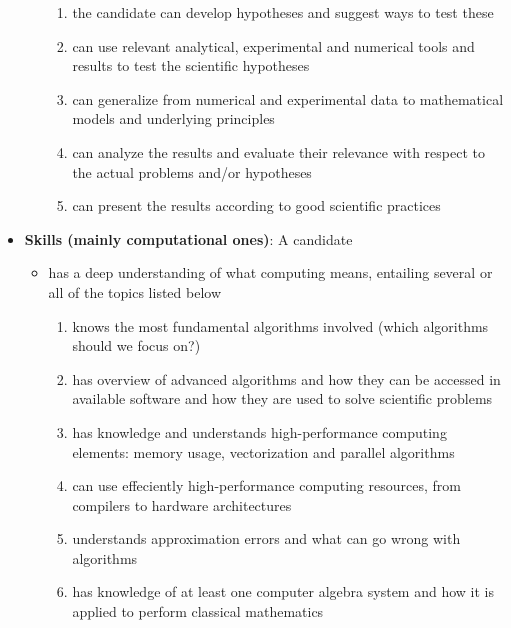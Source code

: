 \documentclass[%
oneside,                 %
final,                   %
10pt]{article}
\begin{document}
\begin{itemize}
\begin{itemize}
\begin{enumerate}
 \item the candidate can develop hypotheses and suggest ways to test these

 \item can use relevant analytical, experimental and numerical tools and results to test the scientific hypotheses

 \item can generalize from numerical and experimental data to mathematical models and underlying principles

 \item can analyze the results and evaluate their relevance with respect to the actual problems and/or hypotheses

 \item can present the results according to good scientific practices

\end{enumerate}

\noindent
\end{itemize}

\noindent
\item \textbf{Skills (mainly computational ones)}: A candidate 
\begin{itemize}

 \item has a deep understanding of what computing means, entailing several or all of the topics listed below
\begin{enumerate}

 \item knows the most fundamental algorithms involved (which algorithms should we focus on?)

 \item has overview of advanced algorithms and how they can be accessed in available software and how they are used to solve scientific problems

 \item has knowledge and understands high-performance computing elements: memory usage, vectorization and parallel algorithms

 \item can use effeciently high-performance computing resources, from compilers to hardware architectures

 \item understands approximation errors and what can go wrong with algorithms

 \item has knowledge of at least one computer algebra system and how it is applied to perform classical mathematics


\end{enumerate}
\end{itemize}
\end{itemize}
\end{document}
